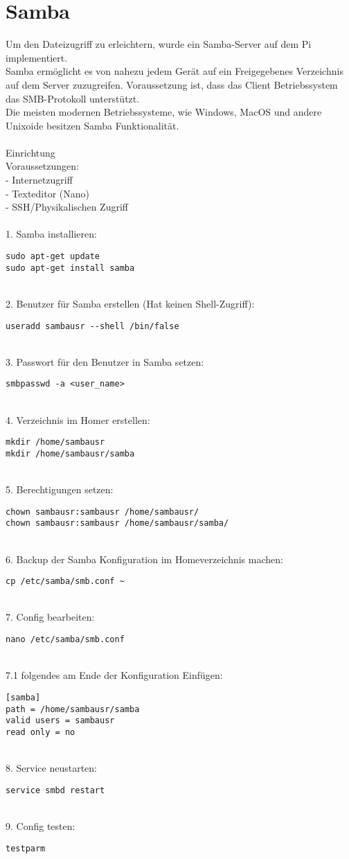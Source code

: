 \section{Samba}
Um den Dateizugriff zu erleichtern, wurde ein Samba-Server auf dem Pi implementiert.\\
Samba ermöglicht es von nahezu jedem Gerät auf ein Freigegebenes Verzeichnis auf dem Server zuzugreifen. Voraussetzung ist, dass das Client Betriebssystem das SMB-Protokoll unterstützt.\\
Die meisten modernen Betriebssysteme, wie Windows, MacOS und andere Unixoide besitzen Samba Funktionalität.\\
~\\
Einrichtung\\
Voraussetzungen:\\
- Internetzugriff\\
- Texteditor (Nano)\\
- SSH/Physikalischen Zugriff\\
\\
1. Samba installieren:
\begin{lstlisting}
sudo apt-get update
sudo apt-get install samba
\end{lstlisting}
~\\
2. Benutzer für Samba erstellen (Hat keinen Shell-Zugriff):
\begin{lstlisting}
useradd sambausr --shell /bin/false
\end{lstlisting}
~\\
3. Passwort für den Benutzer in Samba setzen:
\begin{lstlisting}
smbpasswd -a <user_name>
\end{lstlisting}
~\\
4. Verzeichnis im Homer erstellen:
\begin{lstlisting}
mkdir /home/sambausr
mkdir /home/sambausr/samba
\end{lstlisting}
~\\
5. Berechtigungen setzen:
\begin{lstlisting}
chown sambausr:sambausr /home/sambausr/
chown sambausr:sambausr /home/sambausr/samba/
\end{lstlisting}
~\\
6. Backup der Samba Konfiguration im Homeverzeichnis machen:
\begin{lstlisting}
cp /etc/samba/smb.conf ~
\end{lstlisting}
~\\
7. Config bearbeiten:
\begin{lstlisting}
nano /etc/samba/smb.conf
\end{lstlisting}
~\\
7.1 folgendes am Ende der Konfiguration Einfügen:
\begin{lstlisting}
[samba]
path = /home/sambausr/samba
valid users = sambausr
read only = no
\end{lstlisting}
~\\
8. Service neustarten:
\begin{lstlisting}
service smbd restart
\end{lstlisting}
~\\
9. Config testen:
\begin{lstlisting}
testparm
\end{lstlisting}
